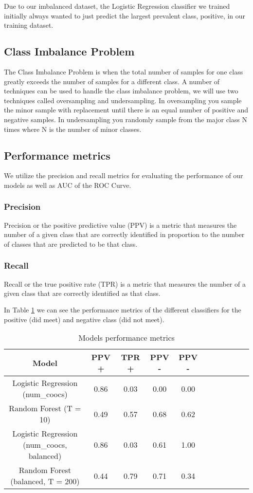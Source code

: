 Due to our imbalanced dataset, the Logistic Regression classifier we trained initially always wanted to just predict the largest prevalent class, positive, in our training dataset.

\subsection{Class Imbalance Problem}
The Class Imbalance Problem is when the total number of samples for one class greatly exceeds the number of samples for a different class. A number of techniques can be used to handle the class imbalance problem, we will use two techniques called oversampling and undersampling\cite{tan2006introduction}. In oversampling you sample the minor sample with replacement until there is an equal number of positive and negative samples. In undersampling you randomly sample from the major class N times where N is the number of minor classes.

\subsection{Performance metrics}
We utilize the precision and recall metrics for evaluating the performance of our models as well as AUC of the ROC Curve.
\subsubsection{Precision}
Precision or the positive predictive value (PPV) is a metric that measures the number of a given class that are correctly identified in proportion to the number of classes that are predicted to be that class.
\subsubsection{Recall}
Recall or the true positive rate (TPR) is a metric that measures the number of a given class that are correctly identified as that class.

In Table \ref{table:models_performance_report} we can see the performance metrics of the different classifiers for the positive (did meet) and negative class (did not meet).

\begin{table}[H]
\centering
\begin{tabular}{|c|c|c|c|c|c|c|c|c|c|c|}
\hline
\textbf{Model} & \textbf{PPV +} & \textbf{TPR +} & \textbf{PPV -} & \textbf{PPV -}   \\
\hline
Logistic Regression (num\_coocs)          & 0.86 & 0.03 & 0.00 & 0.00       \\
\hline
Random Forest (T = 10)    & 0.49 & 0.57 & 0.68 & 0.62\\
\hline
Logistic Regression (num\_coocs, balanced)          & 0.86 & 0.03 & 0.61 & 1.00      \\
\hline
Random Forest (balanced, T = 200)    & 0.44 & 0.79 & 0.71 & 0.34\\
\hline
\end{tabular}
\caption{Models performance metrics}
\label{table:models_performance_report}
\end{table}


